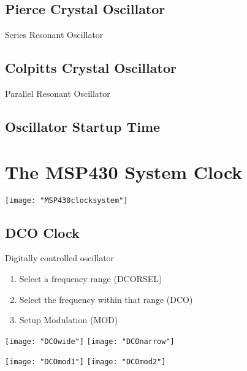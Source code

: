 \subsection{Pierce Crystal Oscillator }
Series Resonant Oscillator

\subsection{Colpitts Crystal Oscillator }
Parallel Resonant Oscillator

\subsection{Oscillator Startup Time }

\section{The MSP430 System Clock }
\texttt{[image: "MSP430clocksystem"]}

\subsection{DCO Clock}
Digitally controlled oscillator
\begin{enumerate}
	\itemsep-.5em 
	\item Select a frequency range (DCORSEL)
	\item Select the frequency within that range (DCO)
	\item Setup Modulation (MOD)
\end{enumerate}
\texttt{[image: "DCOwide"]}
\texttt{[image: "DCOnarrow"]}

\texttt{[image: "DCOmod1"]}
\texttt{[image: "DCOmod2"]}








